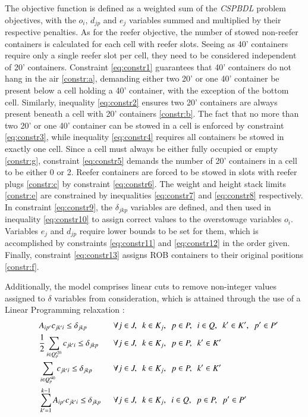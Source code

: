 \documentclass[preprint,12pt,3p]{elsarticle}
\begin{document}
The objective function is defined as a weighted sum of the \textit{CSPBDL} problem objectives, with the $o_i$, $d_{jp}$ and $e_j$ variables summed and multiplied by their respective penalties. As for the reefer objective, the number of stowed non-reefer containers is calculated for each cell with reefer slots. Seeing as 40' containers require only a single reefer slot per cell, they need to be considered independent of 20' containers. 
Constraint \eqref{eq:constr1} guarantees that 40' containers do not hang in the air \ref{constr:a}, demanding either two 20' or one 40' container be present below a cell holding a 40' container, with the exception of the bottom cell. Similarly, inequality \eqref{eq:constr2} ensures two 20' containers are always present beneath a cell with 20' containers \ref{constr:b}. The fact that no more than two 20' or one 40' container can be stowed in a cell is enforced by constraint \eqref{eq:constr3}, while inequality \eqref{eq:constr4} requires all containers be stowed in exactly one cell. Since a cell must always be either fully occupied or empty \ref{constr:g}, constraint \eqref{eq:constr5} demands the number of 20' containers in a cell to be either 0 or 2. Reefer containers are forced to be stowed in slots with reefer plugs \ref{constr:c} by constraint \eqref{eq:constr6}. The weight and height stack limits \ref{constr:e} are constrained by inequalities \eqref{eq:constr7} and \eqref{eq:constr8} respectively. In constraint \eqref{eq:constr9}, the $\delta_{jkp}$ variables are defined, and then used in inequality \eqref{eq:constr10} to assign correct values to the overstowage variables $o_i$. Variables $e_j$ and $d_{jp}$ require lower bounds to be set for them, which is accomplished by constraints \eqref{eq:constr11} and \eqref{eq:constr12} in the order given. Finally, constraint \eqref{eq:constr13} assigns ROB containers to their original positions \ref{constr:f}. \cite{DJJRA12}

Additionally, the model comprises linear cuts to remove non-integer values assigned to $\delta$ variables from consideration, which is attained through the use of a Linear Programming relaxation \cite{DJJRA12}:
\small
\begin{alignat}{4} 
    \quad & A_{ip'}c_{jk'i} \leq \delta_{jkp} && \forall j \in J, \enskip  k \in K_j, \enskip p \in P, \enskip i \in Q, \enskip k' \in K', \enskip p' \in P' \label{eq:constr14}\\
    \quad & \frac{1}{2} \sum_{i \in Q'^{20}_{p}} c_{jk'i} \leq \delta_{jkp} \enskip && \forall j \in J, \enskip k \in K_j, \enskip p \in P, \enskip k' \in K' \label{eq:constr15}\\
    \quad & \sum_{i \in Q'^{40}_{p}} c_{jk'i} \leq \delta_{jkp} && \forall j \in J, \enskip k \in K_j, \enskip p \in P, \enskip k' \in K' \label{eq:constr16}\\
    \quad & \sum_{k'=1}^{k-1} A_{ip'}c_{jk'i} \leq \delta_{jkp} \enskip && \forall j \in J, \enskip k \in K_j, \enskip i \in Q, \enskip p \in P, \enskip p' \in P' \label{eq:constr17}
\end{alignat}
\normalsize
\end{document}
